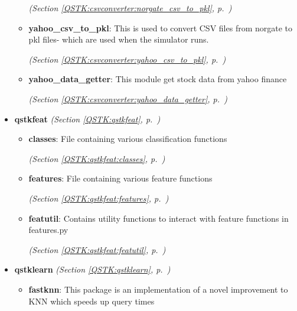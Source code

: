 \begin{itemize}
\begin{itemize}
  \textit{(Section \ref{QSTK:csvconverter:norgate_csv_to_pkl}, p.~\pageref{QSTK:csvconverter:norgate_csv_to_pkl})}

    \item \textbf{yahoo\_csv\_to\_pkl}: This is used to convert CSV files from norgate to pkl files- which are used
when the simulator runs.



  \textit{(Section \ref{QSTK:csvconverter:yahoo_csv_to_pkl}, p.~\pageref{QSTK:csvconverter:yahoo_csv_to_pkl})}

    \item \textbf{yahoo\_data\_getter}: This module get stock data from yahoo finance



  \textit{(Section \ref{QSTK:csvconverter:yahoo_data_getter}, p.~\pageref{QSTK:csvconverter:yahoo_data_getter})}

  \end{itemize}
\item \textbf{qstkfeat}
  \textit{(Section \ref{QSTK:qstkfeat}, p.~\pageref{QSTK:qstkfeat})}

  \begin{itemize}
\setlength{\parskip}{0ex}
    \item \textbf{classes}: File containing various classification functions



  \textit{(Section \ref{QSTK:qstkfeat:classes}, p.~\pageref{QSTK:qstkfeat:classes})}

    \item \textbf{features}: File containing various feature functions



  \textit{(Section \ref{QSTK:qstkfeat:features}, p.~\pageref{QSTK:qstkfeat:features})}

    \item \textbf{featutil}: Contains utility functions to interact with feature functions in 
features.py



  \textit{(Section \ref{QSTK:qstkfeat:featutil}, p.~\pageref{QSTK:qstkfeat:featutil})}

  \end{itemize}
\item \textbf{qstklearn}
  \textit{(Section \ref{QSTK:qstklearn}, p.~\pageref{QSTK:qstklearn})}

  \begin{itemize}
\setlength{\parskip}{0ex}
    \item \textbf{fastknn}: This package is an implementation of a novel improvement to KNN which 
speeds up query times




\end{itemize}
\end{itemize}
